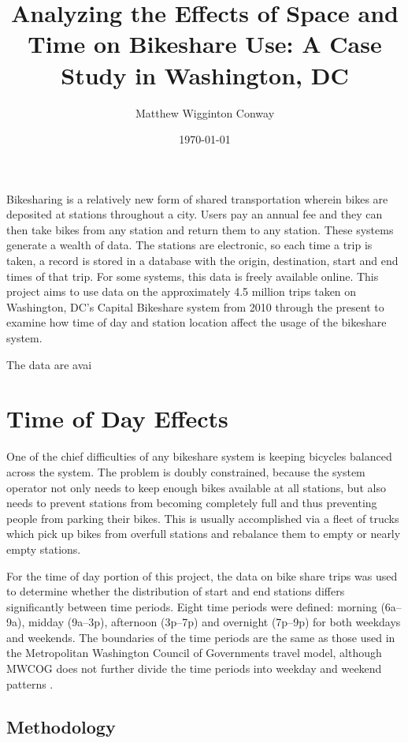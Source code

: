 \documentclass[letterpaper,11pt]{article}
\title{Analyzing the Effects of Space and Time on Bikeshare Use: A Case Study in Washington, DC}
\author{Matthew Wigginton Conway}
\date{\today}
\begin{document}
\maketitle

Bikesharing is a relatively new form of shared transportation wherein
bikes are deposited at stations throughout a city. Users pay an annual
fee and they can then take bikes from any station and return them to
any station. These systems generate a wealth of data. The stations are
electronic, so each time a trip is taken, a record is stored in a
database with the origin, destination, start and end times of that
trip. For some systems, this data is freely available online. This
project aims to use data on the approximately 4.5 million trips taken
on Washington, DC's Capital Bikeshare system from 2010 through the
present to examine how time of day and station location affect the
usage of the bikeshare system.

The data are avai

\section{Time of Day Effects}

One of the chief difficulties of any bikeshare system is keeping
bicycles balanced across the system. The problem is doubly
constrained, because the system operator not only needs to keep enough
bikes available at all stations, but also needs to prevent stations
from becoming completely full and thus preventing people from parking
their bikes. This is usually accomplished via a fleet of trucks which
pick up bikes from overfull stations and rebalance them to empty or
nearly empty stations.

For the time of day portion of this project, the data on bike share
trips was used to determine whether the distribution of start and end
stations differs significantly between time periods. Eight time
periods were defined: morning (6a--9a), midday (9a--3p), afternoon
(3p--7p) and overnight (7p--9p) for both weekdays and weekends. The
boundaries of the time periods are the same as those used in the
Metropolitan Washington Council of Governments travel model, although
MWCOG does not further divide the time periods into weekday and
weekend patterns \autocite[14]{MWCOG2013}.

\subsection{Methodology}
\end{document}
